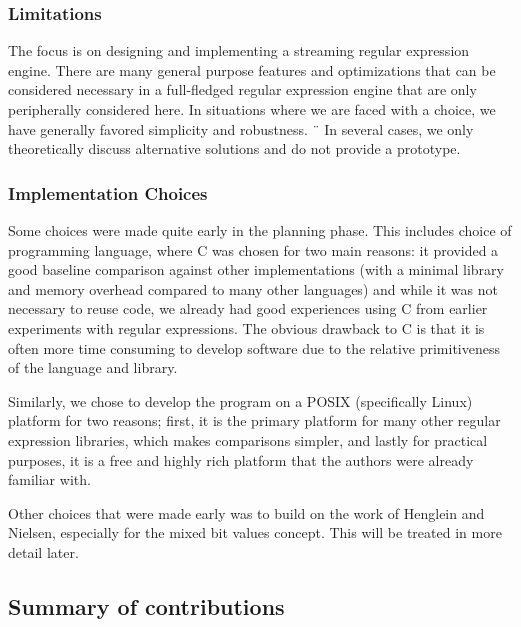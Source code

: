 \subsubsection{Limitations}

The focus is on designing and implementing a streaming regular
expression engine. There are many general purpose features and
optimizations that can be considered necessary in a full-fledged
regular expression engine that are only peripherally considered
here. In situations where we are faced with a choice, we have
generally favored simplicity and robustness.
¨
In several cases, we only theoretically discuss alternative solutions and do not provide a prototype.

\subsubsection{Implementation Choices}
Some choices were made quite early in the planning phase. This includes choice of programming language, where C was chosen for two main reasons: it provided a good baseline comparison against other implementations (with a minimal library and memory overhead compared to many other languages) and while it was not necessary to reuse code, we already had good experiences using C from earlier experiments with regular expressions. The obvious drawback to C is that it is often more time consuming to develop software due to the relative primitiveness of the language and library.

Similarly, we chose to develop the program on a POSIX (specifically Linux) platform for two reasons; first, it is the primary platform for many other regular expression libraries, which makes comparisons simpler, and lastly for practical purposes, it is a free and highly rich platform that the authors were already familiar with.

Other choices that were made early was to build on the work of Henglein and Nielsen, especially for the mixed bit values concept. This will be treated in more detail later.

\subsection{Summary of contributions}

